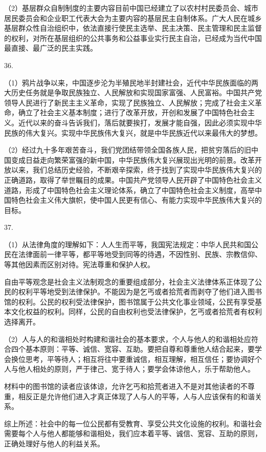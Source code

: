 \documentclass[a4paper]{article}
\begin{document}
（2）基层群众自制制度的主要内容目前中国已经建立了以农村村民委员会、城市居民委员会和企业职工代表大会为主要内容的基层民主自制体系。广大人民在城乡基层群众性自治组织中，依法直接行使民主选举、民主决策、民主管理和民主监督的权利，对所在基层组织的公共事务和公益事业实行民主自治，已经成为当代中国最直接、最广泛的民主实践。

36.

（1）鸦片战争以来，中国逐步沦为半殖民地半封建社会，近代中华民族面临的两大历史任务就是争取民族独立、人民解放和实现国家富强、人民富裕。中国共产党领导人民进行了新民主主义革命，实现了民族独立、人民解放；完成了社会主义革命，确立了社会主义基本制度；进行了改革开放，开创和发展了中国特色社会主义。近代以来的奋斗告诉我们，落后就要挨打，发展才能自强，因此必须实现中华民族的伟大复兴。实现中华民族伟大复兴，就是中华民族近代以来最伟大的梦想。

（2）经过九十多年艰苦奋斗，我们党团结带领全国各族人民，把贫穷落后的旧中国变成日益走向繁荣富强的新中国，中华民族伟大复兴展现出光明的前景。改革开放以来，我们总结历史经验，不断艰辛探索，终于找到了实现中华民族伟大复兴的正确道路，取得了举世瞩目的成果。中国共产党领导人民开辟了中国特色社会主义道路，形成了中国特色社会主义理论体系，确立了中国特色社会主义制度，高举中国特色社会主义伟大旗帜，使中国人民更有信心、有能力实现中华民族伟大复兴的目标。


37.

（1）从法律角度的理解如下：人人生而平等，我国宪法规定：中华人民共和国公民在法律面前一律平等，都平等地受到同等的待遇，不因性别、民族、宗教信仰、等其他因素而区别对待。宪法尊重和保护人权。

自由平等观念是社会主义法制观念的重要组成部分，社会主义法律体系正体现了公民的权利平等地受到法律保护。不能因为是乞丐或者拾荒者而剥夺了他们进入图书馆的权利。公民的权利受法律保护，图书馆属于公共文化事业领域，公民有享受基本文化权益的权利。同样，公民的自由权利也受法律保护，乞丐或者拾荒者有权利选择离开。

（2）人与人的和谐相处时构建和谐社会的基本要求，个人与他人的和谐相处应符合四个基本原则：平等、诚信、宽容、互助。要把自尊和尊重他人结合起来，要学会换位思考，平等待人；相互将往中要重诚信，相互理解，相互信任；要协调好个人与他人相处的原则，严于律己、宽于待人；要学会体谅他人，乐于帮助他人。

材料中的图书馆的读者应该体谅，允许乞丐和拾荒者进入不是对其他读者的不尊重，相反正是允许他们进入才真正体现了人与人的平等，人与人应该保有的和谐关系。

综上所述：社会中的每一位公民都有受教育、享受公共文化设施的权利。和谐社会需要每个人与他人都能够和谐相处，我们应本着平等、诚信、宽容、互助的原则，正确处理好与他人的利益关系。
\end{document}
